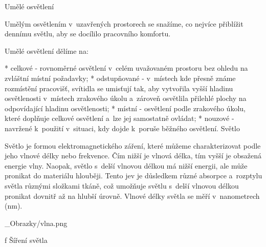 \chap Umělé osvětlení

Umělým osvětlením v~uzavřených prostorech se snažíme, co nejvíce přiblížit dennímu světlu, aby se docílilo pracovního komfortu.

Umělé osvětlení dělíme na:

\begitems
* {\sbf celkové} - rovnoměrné osvětlení v~celém uvažovaném prostoru bez ohledu na zvláštní místní požadavky;
* {\sbf odstupňované} - v~místech kde přesně známe rozmístění pracovišť, svítidla se umisťují tak, aby vytvořila
    vyšší hladinu osvětlenosti v~místech zrakového úkolu a~zároveň osvětlila přilehlé plochy na odpovídající hladinu osvětlenosti;
* {\sbf místní} - osvětlení podle zrakového úkolu, které doplňuje celkové osvětlení a~lze jej samostatně ovládat;
* {\sbf nouzové}  - navržené k~použití v~situaci, kdy dojde k~poruše běžného osvětlení.
\enditems
\sec Světlo


Světlo je formou elektromagnetického záření, které můžeme charakterizovat podle jeho vlnové délky nebo frekvence.
Čím nižší je vlnová délka, tím vyšší je obsažená energie vlny. Naopak, světlo s~delší vlnovou délkou má nižší energii,
ale může pronikat do materiálu hlouběji. Tento jev je důsledkem různé absorpce a~rozptylu světla různými složkami
tkáně, což umožňuje světlu s~delší vlnovou délkou pronikat dovnitř až na hlubší úrovně.
Vlnové délky světla se měří v~nanometrech (nm).

{}
\picw=10cm _Obrazky/vlna.png
\caption/f Šíření světla



